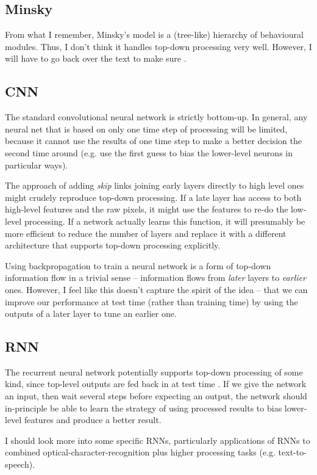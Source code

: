 \documentclass[10pt,a4paper]{article}
\begin{document}
\subsection{Minsky}
From what I remember, Minsky's model is a (tree-like) hierarchy of behavioural modules. Thus, I don't think it handles top-down processing very well. However, I will have to go back over the text to make sure \cite{citationneeded}.

\subsection{CNN}
The standard convolutional neural network is strictly bottom-up. In general, any neural net that is based on only one time step of processing will be limited, because it cannot use the results of one time step to make a better decision the second time around (e.g. use the first guess to bias the lower-level neurons in particular ways).

The approach of adding \emph{skip} links joining early layers directly to high level ones \cite{citationneeded} might crudely reproduce top-down processing. If a late layer has access to both high-level features and the raw pixels, it might use the features to re-do the low-level processing. If a network actually learns this function, it will presumably be more efficient to reduce the number of layers and replace it with a different architecture that supports top-down processing explicitly.

Using backpropagation to train a neural network is a form of top-down information flow in a trivial sense -- information flows from \emph{later} layers to \emph{earlier} ones. However, I feel like this doesn't capture the spirit of the idea -- that we can improve our performance at test time (rather than training time) by using the outputs of a later layer to tune an earlier one.

\subsection{RNN}
The recurrent neural network potentially supports top-down processing of some kind, since top-level outputs are fed back in at test time \cite{citationneeded}. If we give the network an input, then wait several steps before expecting an output, the network should in-principle be able to learn the strategy of using processed results to bias lower-level features and produce a better result.

I should look more into some specific RNNs, particularly applications of RNNs to combined optical-character-recognition plus higher processing tasks (e.g. text-to-speech). \cite{researchneeded}
\end{document}
